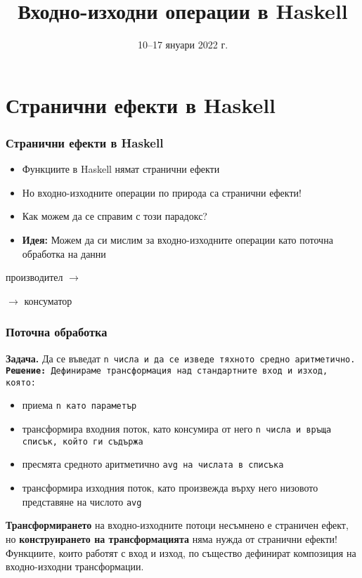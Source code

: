 \documentclass[alsotrans,beameroptions={aspectratio=169}]{beamerswitch}
\title{Входно-изходни операции в Haskell}
\date{10--17 януари 2022 г.}
\begin{document}
\begin{frame}
  \titlepage
\end{frame}

\section{Странични ефекти в Haskell}

\begin{frame}
  \frametitle{Странични ефекти в Haskell}

  \begin{itemize}[<+->]
  \item Функциите в Haskell нямат странични ефекти
  \item Но входно-изходните операции по природа са странични ефекти!
  \item Как можем да се справим с този парадокс?
  \item \textbf{Идея:} Можем да си мислим за входно-изходните операции като поточна обработка на данни
  \end{itemize}
  \onslide<+->
  \begin{center}
    производител
    $\longrightarrow$
     $\longrightarrow$ консуматор
  \end{center}
\end{frame}

\begin{frame}
  \frametitle{Поточна обработка}
  \textbf{Задача.} Да се въведат \tt{n} числа и да се изведе тяхното средно аритметично.\\
  \pause
  \textbf{Решение:} Дефинираме трансформация над стандартните вход и изход, която:
  \begin{itemize}[<+->]
  \item приема \tt{n} като параметър
  \item трансформира входния поток, като \alert{консумира} от него \tt{n} числа и връща списък, който ги съдържа
  \item пресмята средното аритметично \tt{avg} на числата в списъка
  \item трансформира изходния поток, като \alert{произвежда} върху него низовото представяне на числото \tt{avg}
  \end{itemize}
  \onslide<+->
  \textbf{Трансформирането} на входно-изходните потоци несъмнено е страничен ефект, но \textbf{конструирането на трансформацията} няма нужда от странични ефекти!\\
  \onslide<+->
  \alert{Функциите, които работят с вход и изход, по същество дефинират композиция на входно-изходни трансформации.}
\end{frame}
\end{document}
